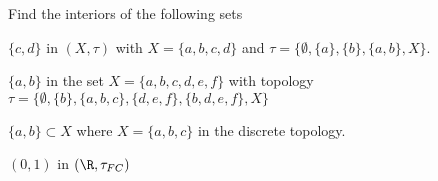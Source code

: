 \begin{activity} \label{act:TS_interiors} Find the interiors of the following sets
\ba
\item $\{c,d\}$ in $(X, \tau)$ with $X= \{a,b,c,d\}$ and $\tau = \{\emptyset, \{a\}, \{b\}, \{a,b\}, X \}$.



\begin{comment}

\solution The only open set that contains $c$ or $d$ is $X$, and $X$ is not a subset of $\{c,d\}$. So $\Int(\{c,d\}) = \emptyset$. 




\end{comment}



\item $\{a,b\}$ in the set $X= \{a,b,c,d,e,f\}$ with topology $\tau= \{\emptyset,\{b\}, \{a,b,c\},\{d,e,f\},\{b,d,e,f\}, X\}$ 



\begin{comment}

\solution None of the open sets containing $a$ are subsets of $\{a,b\}$, so $a \notin \Int(\{a,b\})$. The open set $\{b\}$ is a subset of $\{a,b\}$, so $\int(\{a,b\}) = \{b\}$. 




\end{comment}


\item $\{a,b\} \subset X$ where $X = \{a,b,c\}$ in the discrete topology. 



\begin{comment}

\solution The open sets $\{a\}$ and $\{b\}$ are both subsets of $\{a,b\}$, so $\Int(\{a,b\}) = \{a,b\}$. Note that $\{a,b\}$ is an open set. 



\end{comment}
 

\item $(0,1)$ in $(\R, \tau_{FC})$ 



\begin{comment}

\solution Let $x \in (0,1)$. Suppose $O$ is an open set that contains $x$. Since $O$ is an open set, it follows that $O \setminus (\R \setminus (0,1))$ must be finite. So $O$ contains infinitely many points in $\R \setminus (0,1)$. Therefore, the set $(0,1)$ contains no interior points and $\Int((0,1)) = \emptyset$. every point in $\R$ is both a limit point and a boundary point of $(0,1)$. 

\end{comment}

\ea

\end{activity}




